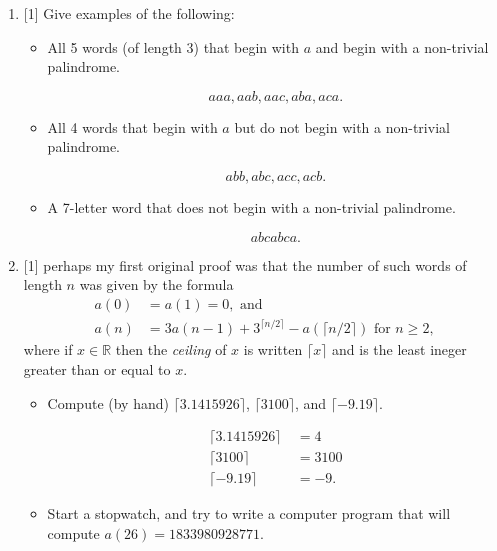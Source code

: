 \documentclass{article}
\begin{document}
\begin{enumerate}
    \item {
        [1] Give examples of the following:
        \begin{itemize}
            \item {
                All 5 words (of length 3) that begin with \(a\) and begin with
                a non-trivial palindrome. 

                \[aaa, aab, aac, aba, aca.\]
            }

            \item{
                All 4 words that begin with \(a\) but do not begin with a non-trivial palindrome.

                \[abb, abc, acc, acb.\]
            }

            \item {
                A 7-letter word that does not begin with a non-trivial palindrome.

                \[abcabca.\]
            }
        \end{itemize}
    }

    \item {
        [1] perhaps my first original proof was that the number of 
        such words of length \(n\) was given by the formula
        \begin{align*}a(0) &= a(1) = 0, \text{ and}\\ a(n) &= 3a(n-1) + 3^{\lceil n/2 \rceil} - a(\lceil n/2 \rceil)\text{ for } n \geq 2 \text{,} \end{align*}
        where if \(x \in \mathbb{R}\) then the \emph{ceiling} of \(x\) is written 
        \(\lceil x \rceil\) and is the least ineger greater than or equal to \(x\).

        \begin{itemize}
            \item {
                Compute (by hand) \(\lceil 3.1415926 \rceil\), \(\lceil 3100 \rceil\), 
                and \(\lceil -9.19 \rceil\).

                \begin{align*}
                    \lceil 3.1415926 \rceil\ &= 4\\
                    \lceil 3100 \rceil\ &= 3100\\
                    \lceil -9.19 \rceil\ &= -9.
                \end{align*}
            }

            \item {
                Start a stopwatch, and try to write a computer program that will 
                compute \(a(26) = 1833980928771\). 

}
\end{itemize}}
\end{enumerate}
\end{document}
